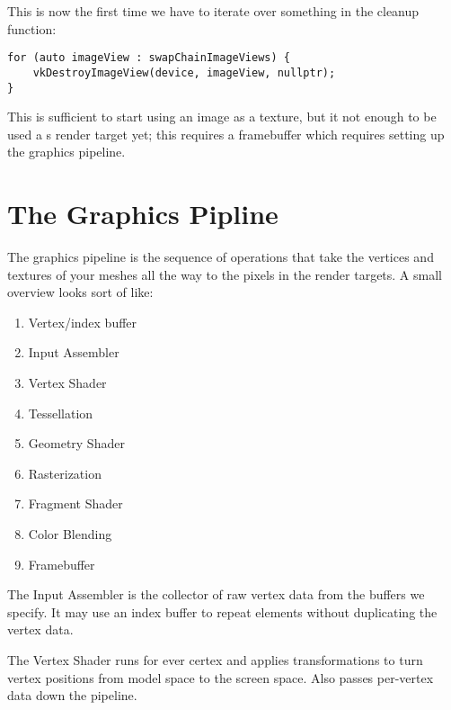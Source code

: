 \par This is now the first time we have to iterate over something in the cleanup function:

\begin{center}
\begin{minipage}{0.95\linewidth}
\begin{lstlisting}
for (auto imageView : swapChainImageViews) {
    vkDestroyImageView(device, imageView, nullptr);
}

\end{lstlisting}
\end{minipage}
\end{center}

\par This is sufficient to start using an image as a texture, but it not enough to be used a s render target yet; this requires a framebuffer which requires setting up the graphics pipeline.

\section*{The Graphics Pipline}

\par The graphics pipeline is the sequence of operations that take the vertices and textures of your meshes all the way to the pixels in the render targets. A small overview looks sort of like:
\begin{center}
\begin{enumerate}
\item Vertex/index buffer
\item Input Assembler
\item Vertex Shader
\item Tessellation
\item Geometry Shader
\item Rasterization
\item Fragment Shader
\item Color Blending
\item Framebuffer
\end{enumerate}
\end{center}

\par The Input Assembler is the collector of raw vertex data from the buffers we specify. It may use an index buffer to repeat elements without duplicating the vertex data.

\par The Vertex Shader runs for ever certex and applies transformations to turn vertex positions from model space to the screen space. Also passes per-vertex data down the pipeline.


